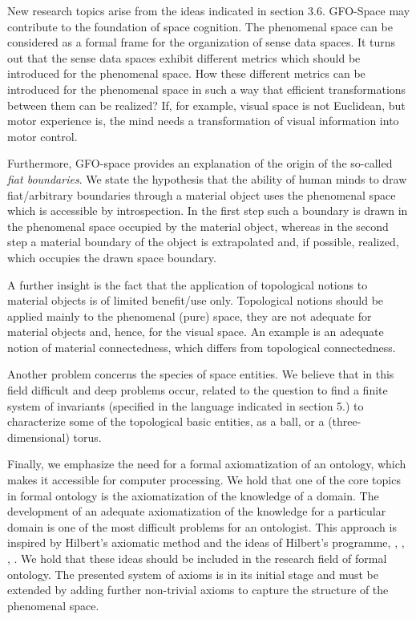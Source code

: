 \documentclass{ao2e}
\begin{document}
{New research topics arise from the ideas indicated in section 3.6. GFO-Space may contribute to the foundation of space cognition. The phenomenal space can be considered as a formal frame for the organization of sense data spaces.
It turns out that the sense data spaces exhibit different metrics which should be introduced for the phenomenal space. How these different metrics can be introduced for the phenomenal space in such a way that efficient transformations between them can be realized? If, for example, visual space is not Euclidean, but motor experience
is, the mind needs a transformation of visual information into motor control.

Furthermore, GFO-space provides an explanation of the origin of the so-called {\it fiat boundaries}. We state the hypothesis that the ability of human minds to draw fiat/arbitrary boundaries through a material object uses the phenomenal space which is accessible by introspection. In the first step such a boundary is drawn in the phenomenal space occupied by the material object, whereas in the second step a material boundary of the object is extrapolated and, if possible, realized, which occupies the drawn space boundary.

A further insight is the fact that the application of topological notions to material objects is of limited benefit/use only. Topological notions should be applied mainly to the phenomenal (pure) space, they are not adequate for material objects and, hence, for the visual space. An example is an adequate notion of material connectedness, which differs from topological connectedness.

Another problem concerns the species of space entities. We believe that in this field difficult and deep problems occur, related to the question to find a finite system of invariants
(specified in the language indicated in section 5.) to characterize some of the topological basic entities, as a ball,
or a (three-dimensional) torus.

Finally, we emphasize the need for a formal axiomatization of an ontology, which makes it accessible for computer processing. We hold that one of the core topics in formal ontology is the axiomatization of the knowledge of a domain. The development of an adequate axiomatization of the knowledge for a particular domain is one of the most difficult problems for an ontologist. This approach is inspired by Hilbert's axiomatic method and the ideas of Hilbert's programme, \cite{hilbert-d-1918-a}, \cite{hilbert-d-1929-a}, \cite{hilbert-d-1934-a}, \cite{hilbert-d-1939-a}. We hold that these ideas should be included in the research field of formal ontology. The presented system of axioms is in its initial stage and must be extended by adding further non-trivial axioms to capture the structure of the phenomenal space.
 
}
\end{document}
